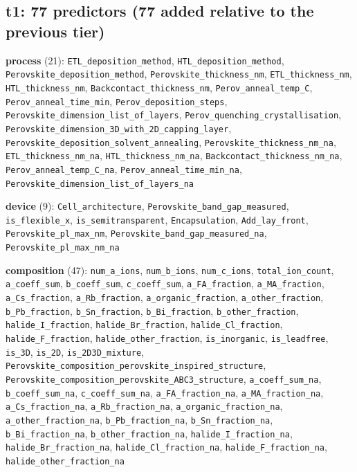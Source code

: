 \documentclass[10pt]{article}
\begin{document}
\subsection*{t1: 77 predictors (77 added relative to the previous tier)}
\textbf{process} (21): \texttt{ETL\_deposition\_method}, \texttt{HTL\_deposition\_method}, \texttt{Perovskite\_deposition\_method}, \texttt{Perovskite\_thickness\_nm}, \texttt{ETL\_thickness\_nm}, \texttt{HTL\_thickness\_nm}, \texttt{Backcontact\_thickness\_nm}, \texttt{Perov\_anneal\_temp\_C}, \texttt{Perov\_anneal\_time\_min}, \texttt{Perov\_deposition\_steps}, \texttt{Perovskite\_dimension\_list\_of\_layers}, \texttt{Perov\_quenching\_crystallisation}, \texttt{Perovskite\_dimension\_3D\_with\_2D\_capping\_layer}, \texttt{Perovskite\_deposition\_solvent\_annealing}, \texttt{Perovskite\_thickness\_nm\_na}, \texttt{ETL\_thickness\_nm\_na}, \texttt{HTL\_thickness\_nm\_na}, \texttt{Backcontact\_thickness\_nm\_na}, \texttt{Perov\_anneal\_temp\_C\_na}, \texttt{Perov\_anneal\_time\_min\_na}, \texttt{Perovskite\_dimension\_list\_of\_layers\_na}\par\smallskip
\textbf{device} (9): \texttt{Cell\_architecture}, \texttt{Perovskite\_band\_gap\_measured}, \texttt{is\_flexible\_x}, \texttt{is\_semitransparent}, \texttt{Encapsulation}, \texttt{Add\_lay\_front}, \texttt{Perovskite\_pl\_max\_nm}, \texttt{Perovskite\_band\_gap\_measured\_na}, \texttt{Perovskite\_pl\_max\_nm\_na}\par\smallskip
\textbf{composition} (47): \texttt{num\_a\_ions}, \texttt{num\_b\_ions}, \texttt{num\_c\_ions}, \texttt{total\_ion\_count}, \texttt{a\_coeff\_sum}, \texttt{b\_coeff\_sum}, \texttt{c\_coeff\_sum}, \texttt{a\_FA\_fraction}, \texttt{a\_MA\_fraction}, \texttt{a\_Cs\_fraction}, \texttt{a\_Rb\_fraction}, \texttt{a\_organic\_fraction}, \texttt{a\_other\_fraction}, \texttt{b\_Pb\_fraction}, \texttt{b\_Sn\_fraction}, \texttt{b\_Bi\_fraction}, \texttt{b\_other\_fraction}, \texttt{halide\_I\_fraction}, \texttt{halide\_Br\_fraction}, \texttt{halide\_Cl\_fraction}, \texttt{halide\_F\_fraction}, \texttt{halide\_other\_fraction}, \texttt{is\_inorganic}, \texttt{is\_leadfree}, \texttt{is\_3D}, \texttt{is\_2D}, \texttt{is\_2D3D\_mixture}, \texttt{Perovskite\_composition\_perovskite\_inspired\_structure}, \texttt{Perovskite\_composition\_perovskite\_ABC3\_structure}, \texttt{a\_coeff\_sum\_na}, \texttt{b\_coeff\_sum\_na}, \texttt{c\_coeff\_sum\_na}, \texttt{a\_FA\_fraction\_na}, \texttt{a\_MA\_fraction\_na}, \texttt{a\_Cs\_fraction\_na}, \texttt{a\_Rb\_fraction\_na}, \texttt{a\_organic\_fraction\_na}, \texttt{a\_other\_fraction\_na}, \texttt{b\_Pb\_fraction\_na}, \texttt{b\_Sn\_fraction\_na}, \texttt{b\_Bi\_fraction\_na}, \texttt{b\_other\_fraction\_na}, \texttt{halide\_I\_fraction\_na}, \texttt{halide\_Br\_fraction\_na}, \texttt{halide\_Cl\_fraction\_na}, \texttt{halide\_F\_fraction\_na}, \texttt{halide\_other\_fraction\_na}\par\smallskip
\end{document}
